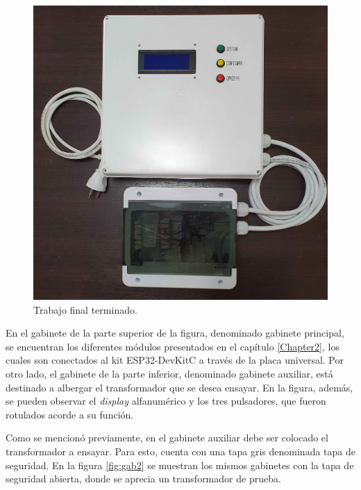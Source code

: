 \begin{figure}[htpb]
	\centering
	\includegraphics[scale=0.16]{./Figures/gab1.jpg}
	\caption{Trabajo final terminado.}
	\label{fig:gab1}
\end{figure}

En el gabinete de la parte superior de la figura, denominado gabinete principal, se encuentran los diferentes módulos presentados en el capítulo \ref{Chapter2}, los cuales son conectados al kit ESP32-DevKitC a través de la placa universal. Por otro lado, el gabinete de la parte inferior, denominado gabinete auxiliar, está destinado a albergar el transformador que se desea ensayar. En la figura, además, se pueden observar el \textit{display} alfanumérico y los tres pulsadores, que fueron rotulados acorde a su función. 

Como se mencionó previamente, en el gabinete auxiliar debe ser colocado el transformador a ensayar. Para esto, cuenta con una tapa gris denominada tapa de seguridad. En la figura \ref{fig:gab2} se muestran los mismos gabinetes con la tapa de seguridad abierta, donde se aprecia un transformador de prueba. 

